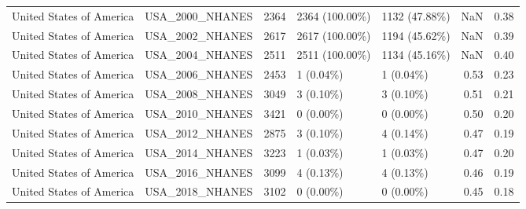 \begin{longtable}{llrllrr}
United States of America & USA\_2000\_NHANES & 2364 & 2364 (100.00\%) & 1132 (47.88\%) & NaN & 0.38\\
United States of America & USA\_2002\_NHANES & 2617 & 2617 (100.00\%) & 1194 (45.62\%) & NaN & 0.39\\
United States of America & USA\_2004\_NHANES & 2511 & 2511 (100.00\%) & 1134 (45.16\%) & NaN & 0.40\\
United States of America & USA\_2006\_NHANES & 2453 & 1 (0.04\%) & 1 (0.04\%) & 0.53 & 0.23\\
United States of America & USA\_2008\_NHANES & 3049 & 3 (0.10\%) & 3 (0.10\%) & 0.51 & 0.21\\
United States of America & USA\_2010\_NHANES & 3421 & 0 (0.00\%) & 0 (0.00\%) & 0.50 & 0.20\\
United States of America & USA\_2012\_NHANES & 2875 & 3 (0.10\%) & 4 (0.14\%) & 0.47 & 0.19\\
United States of America & USA\_2014\_NHANES & 3223 & 1 (0.03\%) & 1 (0.03\%) & 0.47 & 0.20\\
United States of America & USA\_2016\_NHANES & 3099 & 4 (0.13\%) & 4 (0.13\%) & 0.46 & 0.19\\
United States of America & USA\_2018\_NHANES & 3102 & 0 (0.00\%) & 0 (0.00\%) & 0.45 & 0.18\\*
\end{longtable}
\endgroup{}
